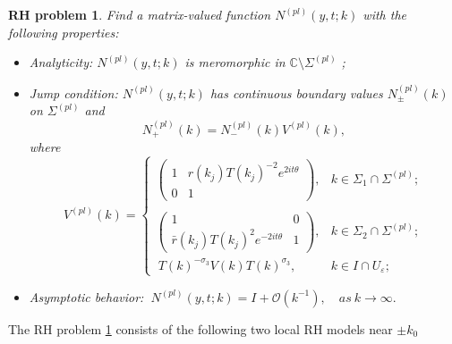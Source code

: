 \documentclass[11pt]{article}
\numberwithin{equation}{section}
\newtheorem{RHP}{RH problem}
\begin{document}
\begin{RHP}\label{rhp25}
     Find a   matrix-valued function $N^{(pl)}(y,t;k)$ with the following properties:
       \begin{itemize}
  \item Analyticity: $N^{(pl)}(y,t;k)$ is meromorphic in $\mathbb{C}\setminus \Sigma^{(pl)}$ ;
  \item Jump condition: $N^{(pl)}(y,t;k)$ has continuous boundary values $N^{(pl)}_{\pm}(k)$ on $\Sigma^{(pl)}$ and
 \begin{equation}
N^{(pl)}_+(k)=N^{(pl)}_-(k)V^{(pl)}(k),
\end{equation}
where
\begin{equation}
V^{(pl)}(k)=\left\{\begin{array}{lll}
\left(\begin{array}{cc}
1 & r(k_j)T(k_j)^{-2} e^{2it\theta}\\
0 & 1
\end{array}\right), & k\in \Sigma_{1}\cap\Sigma^{(pl)};\\
\\
\left(\begin{array}{cc}
1 & 0\\
\bar{r}(k_j)T(k_j)^{2}e^{-2it\theta} & 1
\end{array}\right),  &k\in \Sigma_{2}\cap\Sigma^{(pl)};\\
\ T(k)^{-\sigma_3}V(k)T(k)^{\sigma_3},&k\in I\cap U_{\varepsilon};

\end{array}\right.
\end{equation}
  \item Asymptotic behavior:
  $\ N^{(pl)}(y,t;k)=I+\mathcal{O}(k^{-1}),\quad as \ k\to \infty.$
\end{itemize}
\end{RHP}

 The RH problem \ref{rhp25} consists  of the following two local RH  models  near $\pm k_0$
\end{document}
